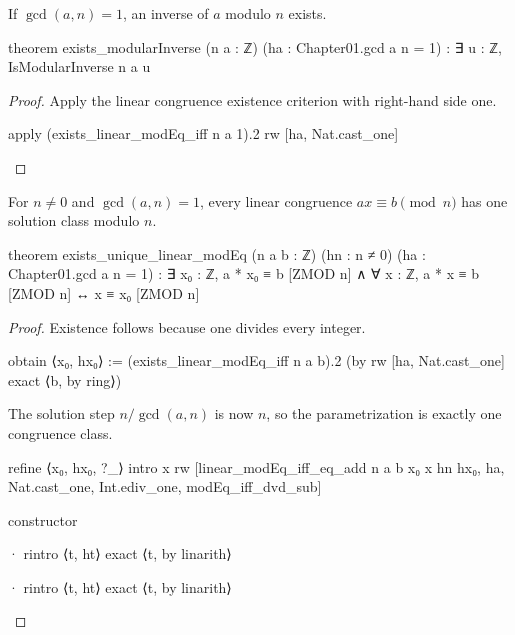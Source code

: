 \begin{theorem}
  \label{ent:thm:exists-modularinverse}
  If $\gcd(a,n)=1$, an inverse of $a$ modulo $n$ exists.

  \begin{lean}
    theorem exists_modularInverse (n a : ℤ) (ha : Chapter01.gcd a n = 1) :
        ∃ u : ℤ, IsModularInverse n a u
  \end{lean}
\end{theorem}

\begin{proof}
  Apply the linear congruence existence criterion with right-hand side one.

  \begin{lean}
    apply (exists_linear_modEq_iff n a 1).2
    rw [ha, Nat.cast_one]
  \end{lean}
\end{proof}

\begin{theorem}
  \label{ent:thm:exists-unique-linear-modeq}
  For $n\ne0$ and $\gcd(a,n)=1$, every linear congruence $ax\equiv b\pmod n$ has one solution
  class modulo $n$.

  \begin{lean}
    theorem exists_unique_linear_modEq (n a b : ℤ) (hn : n ≠ 0)
        (ha : Chapter01.gcd a n = 1) :
        ∃ x₀ : ℤ, a * x₀ ≡ b [ZMOD n] ∧
          ∀ x : ℤ, a * x ≡ b [ZMOD n] ↔ x ≡ x₀ [ZMOD n]
  \end{lean}
\end{theorem}

\begin{proof}
  Existence follows because one divides every integer.

  \begin{lean}
    obtain ⟨x₀, hx₀⟩ := (exists_linear_modEq_iff n a b).2 (by
      rw [ha, Nat.cast_one]
      exact ⟨b, by ring⟩)
  \end{lean}

  The solution step $n/\gcd(a,n)$ is now $n$, so the parametrization is exactly one congruence
  class.

  \begin{lean}
    refine ⟨x₀, hx₀, ?_⟩
    intro x
    rw [linear_modEq_iff_eq_add n a b x₀ x hn hx₀, ha, Nat.cast_one, Int.ediv_one,
      modEq_iff_dvd_sub]

    constructor

    · rintro ⟨t, ht⟩
      exact ⟨t, by linarith⟩

    · rintro ⟨t, ht⟩
      exact ⟨t, by linarith⟩
  \end{lean}
\end{proof}


